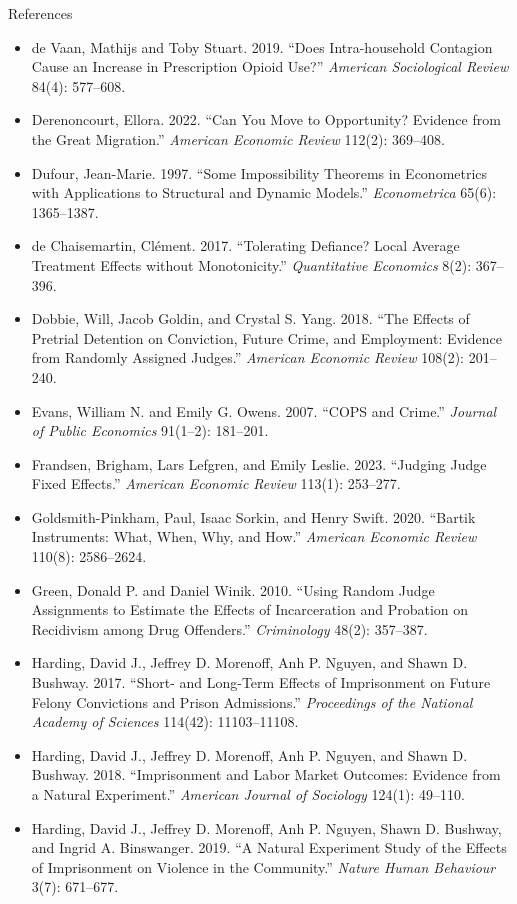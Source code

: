 \documentclass[aspectratio=169,11pt,xcolor=dvipsnames]{beamer}
\begin{document}
\begin{frame}[allowframebreaks,t]{References}
\begin{itemize}
\item de Vaan, Mathijs and Toby Stuart. 2019. ``Does Intra-household Contagion Cause an Increase in Prescription Opioid Use?'' \textit{American Sociological Review} 84(4): 577--608.
\item Derenoncourt, Ellora. 2022. ``Can You Move to Opportunity? Evidence from the Great Migration.'' \textit{American Economic Review} 112(2): 369--408.
\item Dufour, Jean-Marie. 1997. ``Some Impossibility Theorems in Econometrics with Applications to Structural and Dynamic Models.'' \textit{Econometrica} 65(6): 1365--1387.
\item de Chaisemartin, Cl\'ement. 2017. ``Tolerating Defiance? Local Average Treatment Effects without Monotonicity.'' \textit{Quantitative Economics} 8(2): 367--396.
\item Dobbie, Will, Jacob Goldin, and Crystal S. Yang. 2018. ``The Effects of Pretrial Detention on Conviction, Future Crime, and Employment: Evidence from Randomly Assigned Judges.'' \textit{American Economic Review} 108(2): 201--240.
\item Evans, William N. and Emily G. Owens. 2007. ``COPS and Crime.'' \textit{Journal of Public Economics} 91(1--2): 181--201.
\item Frandsen, Brigham, Lars Lefgren, and Emily Leslie. 2023. ``Judging Judge Fixed Effects.'' \textit{American Economic Review} 113(1): 253--277.
\item Goldsmith-Pinkham, Paul, Isaac Sorkin, and Henry Swift. 2020. ``Bartik Instruments: What, When, Why, and How.'' \textit{American Economic Review} 110(8): 2586--2624.
\item Green, Donald P. and Daniel Winik. 2010. ``Using Random Judge Assignments to Estimate the Effects of Incarceration and Probation on Recidivism among Drug Offenders.'' \textit{Criminology} 48(2): 357--387.
\item Harding, David J., Jeffrey D. Morenoff, Anh P. Nguyen, and Shawn D. Bushway. 2017. ``Short- and Long-Term Effects of Imprisonment on Future Felony Convictions and Prison Admissions.'' \textit{Proceedings of the National Academy of Sciences} 114(42): 11103--11108.
\item Harding, David J., Jeffrey D. Morenoff, Anh P. Nguyen, and Shawn D. Bushway. 2018. ``Imprisonment and Labor Market Outcomes: Evidence from a Natural Experiment.'' \textit{American Journal of Sociology} 124(1): 49--110.
\item Harding, David J., Jeffrey D. Morenoff, Anh P. Nguyen, Shawn D. Bushway, and Ingrid A. Binswanger. 2019. ``A Natural Experiment Study of the Effects of Imprisonment on Violence in the Community.'' \textit{Nature Human Behaviour} 3(7): 671--677.

\end{itemize}
\end{frame}
\end{document}
